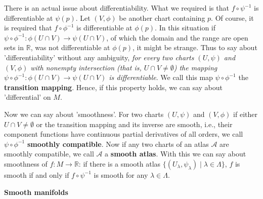 \documentclass{article}
\newcommand{\ReR}{\mathbb{R}}
\newcommand{\SBar}{\;|\;}
\begin{document}
There is an actual issue about differentiability.
What we required is that $f \circ \psi^{-1}$ is differentiable at $\psi(p)$.
Let $(V, \phi)$ be another chart containing $p$.
Of course, it is required that $f \circ \phi^{-1}$ is differentiable at $\phi(p)$.
In this situation if $\psi \circ \phi^{-1} : \phi(U \cap V) \to \psi(U \cap V)$, of which the domain and the range are open sets in $\ReR$, was not differentiable at $\phi(p)$, it might be strange.
Thus to say about 'differentiability' without any ambiguity, \textit{for every two charts $(U, \psi)$ and $(V, \phi)$ with nonempty intersection (that is, $U \cap V \ne \emptyset$) the mapping $\psi \circ \phi^{-1} : \phi(U \cap V) \to \psi(U \cap V)$ is differentiable}.
We call this map $\psi \circ \phi^{-1}$ the \textbf{transition mapping}.
Hence, if this property holds, we can say about 'differential' on $M$.

Now we can say about 'smoothness'.
For two charts $(U, \psi)$ and $(V, \phi)$ if either $U \cap V \ne \emptyset$ or the transition mapping and its inverse are smooth, i.e., their component functions have continuous partial derivatives of all orders, we call $\psi \circ \phi^{-1}$ \textbf{smoothly compatible}.
Now if any two charts of an atlas $\mathcal{A}$ are smoothly compatible, we call $\mathcal{A}$ a \textbf{smooth atlas}.
With this we can say about smoothness of $f : M \to \ReR$: if there is a smooth atlas $\{(U_\lambda, \psi_\lambda) \SBar \lambda \in \Lambda\}$, $f$ is smooth if and only if $f \circ \psi^{-1}$ is smooth for any $\lambda \in \Lambda$.

\newpage

\textbf{Smooth manifolds}
\end{document}
